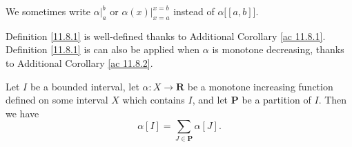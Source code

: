 \begin{note}
    We sometimes write \(\alpha\big|_a^b\) or \(\alpha(x)\big|_{x = a}^{x = b}\) instead of \(\alpha\big[[a, b]\big]\).
\end{note}

\begin{note}
    Definition \ref{11.8.1} is well-defined thanks to Additional Corollary \ref{ac 11.8.1}.
    Definition \ref{11.8.1} is can also be applied when \(\alpha\) is monotone decreasing, thanks to Additional Corollary \ref{ac 11.8.2}.
\end{note}

\setcounter{theorem}{3}
\begin{lemma}\label{11.8.4}
    Let \(I\) be a bounded interval, let \(\alpha : X \to \mathbf{R}\) be a monotone increasing function defined on some interval \(X\) which contains \(I\), and let \(\mathbf{P}\) be a partition of \(I\).
    Then we have
    \[
        \alpha[I] = \sum_{J \in \mathbf{P}} \alpha[J].
    \]
\end{lemma}

